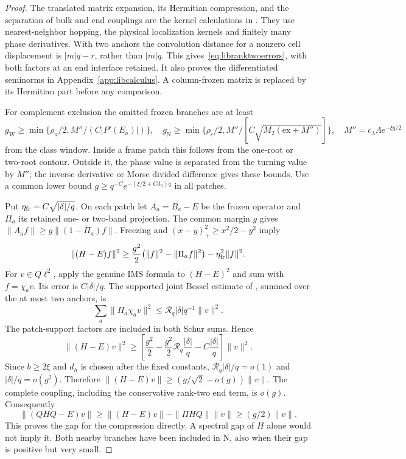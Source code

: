 \begin{proof}
The translated matrix expansion, its Hermitian compression, and the
separation of bulk and end couplings are the kernel calculations in
\cite[Appendices C--D]{DMband}. They use nearest-neighbor hopping,
the physical localization kernels and finitely many phase
derivatives. With two anchors the convolution distance for a
nonzero cell displacement is $|m|q-r$, rather than $|m|q$.
This gives~\eqref{eq:libranktwoerrors}, with both factors at an end
interface retained. It also proves the differentiated seminorms
in Appendix~\ref{app:libcalculus}. A column-frozen matrix is replaced
by its Hermitian part before any comparison.

For complement exclusion the omitted frozen branches are at least
\[
 g_{\mathrm W}\ge\min\{\rho_a/2,M''/(C|P'(E_a)|)\},\quad
 g_{\mathrm N}\ge\min\{\rho_c/2,
       M''/[C\sqrt{M_2(\mathrm{ex}+M'')}]\},
 \quad M''=c_\lambda\Lambda e^{-\xi q/2}
\]
from the class window. Inside a frame patch this follows from the
one-root or two-root contour. Outside it, the phase value is
separated from the turning value by $M''$; the inverse derivative
or Morse divided difference gives these bounds. Use a common lower
bound $g\ge q^{-C}e^{-(\xi/2+Cd_h)q}$ in all patches.

Put $\eta_{\rm fr}=C\sqrt{|\delta|/q}$. On each patch let
$A_a=B_a-E$ be the frozen operator and $\Pi_a$ its retained one- or
two-band projection. The common margin $g$ gives
$\|A_a f\|\ge g\|(1-\Pi_a)f\|$. Freezing and
$(x-y)_+^2\ge x^2/2-y^2$ imply
\[
 \|(H-E)f\|^2\ge\frac{g^2}{2}
       \bigl(\|f\|^2-\|\Pi_a f\|^2\bigr)
       -\eta_{\rm fr}^2\|f\|^2.
\]
For $v\in Q\ell^2$, apply the genuine IMS formula to $(H-E)^2$
and sum with $f=\chi_a v$. Its error is $C|\delta|/q$.
The supported joint Bessel estimate of
\cite[Appendix D, Excluding the complementary subspace]{DMband},
summed over the at most two anchors, is
\[
 \sum_a\|\Pi_a\chi_a v\|^2\le
       \mathcal R_q|\delta|q^{-1}\|v\|^2.
\]
The patch-support factors are included in both Schur sums. Hence
\[
 \|(H-E)v\|^2\ge
 \left[\frac{g^2}{2}-\frac{g^2}{2}\mathcal R_q\frac{|\delta|}{q}
                  -C\frac{|\delta|}{q}\right]\|v\|^2.
\]
Since $b\ge2\xi$ and $d_h$ is chosen after the fixed constants,
$\mathcal R_q|\delta|/q=o(1)$ and $|\delta|/q=o(g^2)$.
Therefore $\|(H-E)v\|\ge(g/\sqrt2-o(g))\|v\|$.
The complete coupling, including the conservative rank-two end
term, is $o(g)$. Consequently
\[
 \|(QHQ-E)v\|\ge\|(H-E)v\|-\|\Pi HQ\|\|v\|
       \ge(g/2)\|v\|.
\]
This proves the gap for the compression directly. A spectral gap of
$H$ alone would not imply it. Both nearby branches have been
included in N, also when their gap is positive but very small.
\end{proof}

